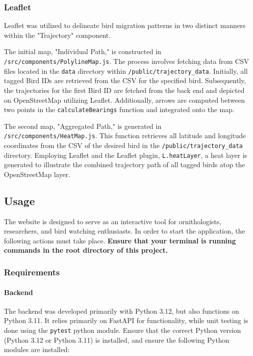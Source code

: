 \documentclass{article}
\begin{document}
\subsubsection{Leaflet}
Leaflet was utilized to delineate bird migration patterns in two distinct manners within the "Trajectory" component. 

The initial map, "Individual Path," is constructed in \texttt{/src/components/PolylineMap.js}. The process involves fetching data from CSV files located in the \texttt{data} directory within \texttt{/public/trajectory\_data}. Initially, all tagged Bird IDs are retrieved from the CSV for the specified bird. Subsequently, the trajectories for the first Bird ID are fetched from the back end and depicted on OpenStreetMap utilizing Leaflet. Additionally, arrows are computed between two points in the \texttt{calculateBearings} function and integrated onto the map.

The second map, "Aggregated Path," is generated in \texttt{/src/components/HeatMap.js}. This function retrieves all latitude and longitude coordinates from the CSV of the desired bird in the \texttt{/public/trajectory\_data} directory. Employing Leaflet and the Leaflet plugin, \texttt{L.heatLayer}, a heat layer is generated to illustrate the combined trajectory path of all tagged birds atop the OpenStreetMap layer.


\subsection{Usage}
The website is designed to serve as an interactive tool for ornithologists, researchers, and bird watching enthusiasts. In order to start the application, the following actions must take place. \textbf{Ensure that your terminal is running commands in the root directory of this project.}

\subsubsection{Requirements}

\paragraph{Backend} The backend was developed primarily with Python 3.12, but also functions on Python 3.11. It relies primarily on FastAPI for functionality, while unit testing is done using the \texttt{pytest} python module. Ensure that the correct Python version (Python 3.12 or Python 3.11) is installed, and ensure the following Python modules are installed:
\end{document}
